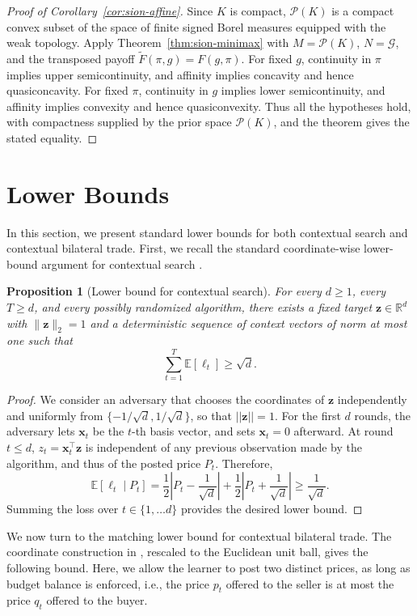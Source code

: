 \documentclass[11pt]{article}
\newtheorem{proposition}[theorem]{Proposition}
\newcommand{\E}[1]{\mathbb E\left[#1\right]}
\newcommand{\Rbb}{\mathbb R}
\newcommand{\norm}[1]{\lVert #1\rVert_2}
\newcommand{\bx}{\boldsymbol x}
\newcommand{\bz}{\boldsymbol z}
\begin{document}
\begin{proof}[{Proof of Corollary~\ref{cor:sion-affine}}]
Since $K$ is compact, $\mathcal P(K)$ is a compact convex subset of the space of finite signed Borel measures equipped with the weak topology. Apply Theorem~\ref{thm:sion-minimax} with $M=\mathcal P(K)$, $N=\mathcal G$, and the transposed payoff $\widetilde F(\pi,g)=F(g,\pi)$. For fixed $g$, continuity in $\pi$ implies upper semicontinuity, and affinity implies concavity and hence quasiconcavity. For fixed $\pi$, continuity in $g$ implies lower semicontinuity, and affinity implies convexity and hence quasiconvexity. Thus all the hypotheses hold, with compactness supplied by the prior space $\mathcal P(K)$, and the theorem gives the stated equality.
\end{proof}
\section{Lower Bounds}\label{app:lower-bound}\label{sec:trade-lower-bound}

In this section, we present standard lower bounds for both contextual search and contextual bilateral trade.
First, we recall the standard coordinate-wise lower-bound argument for contextual search \cite{LPS21}.

\begin{proposition}[Lower bound for contextual search]\label{prop:lower-bound}
For every $d\ge1$, every $T\ge d$, and every possibly randomized algorithm, there exists a fixed target $\bz\in \Rbb^d$ with $\norm{\bz}=1$ and a deterministic sequence of context vectors of norm at most one such that
\[
 \sum_{t=1}^T\E{\ell_t}\ge\sqrt d.
\]
\end{proposition}
\begin{proof}
We consider an adversary that chooses the coordinates of $\bz$ independently and uniformly from $\{-1/\sqrt d,1/\sqrt d\}$, so that $||\bz||=1$. For the first $d$ rounds, the adversary lets $\bx_t$ be the $t$-th basis vector, and sets $\bx_t=0$ afterward. At round $t\leq d$, $z_t = \bx_t^\top \bz$ is independent of any previous observation {made by} the algorithm, and thus of the posted price $P_t${. Therefore,} 
\[
 \E{\ell_t\mid P_t}
 =\frac12\left|P_t-\frac1{\sqrt d}\right|
  +\frac12\left|P_t+\frac1{\sqrt d}\right|
 \ge\frac1{\sqrt d}.
\]
Summing the loss over $t\in \{1,\dots d\}$ provides the desired lower bound. 
\end{proof}


We now turn to the matching lower bound for contextual bilateral trade. The coordinate construction in \cite[Proposition~4.3]{CFGLPR26}, rescaled to the Euclidean unit ball, gives the following bound. {Here, we allow} the learner to post two distinct prices, as long as budget balance is enforced, i.e., the {price $p_t$ offered to the seller} is at most {the price $q_t$ offered to the buyer}.
\end{document}
